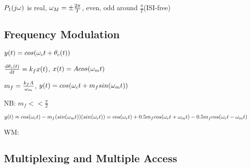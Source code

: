 $P_1(j\omega)$ is real, $\omega_M=\pm \frac{2\pi}{T}$, even, odd around $\frac{\pi}{T}$(ISI-free)

\subsection*{Frequency Modulation}
$y(t)=cos(\omega_c t + \theta_c(t))$

$\frac{\mathrm{d} \theta_c(t)}{\mathrm{d} t}=k_f x(t)$,   $x(t)=Acos(\omega_m t)$

$m_f=\frac{k_f A}{\omega_m}$,   $y(t)=cos(\omega_c t + m_f sin(\omega_m t))$

NB: $m_f << \frac{\pi}{2}$

$y(t) \approx cos(\omega_c t)-m_f (sin(\omega_m t))(sin(\omega_c t))=cos(\omega_c t) + 0.5m_f cos(\omega_c t + \omega_m t) - 0.5m_f cos(\omega_c t - \omega_m t)$

WM:

\subsection*{Multiplexing and Multiple Access}








